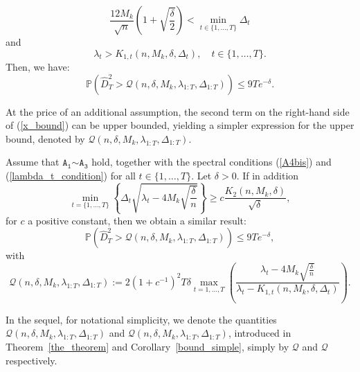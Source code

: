 \documentclass[twoside,11pt]{article}
\newcommand{\nb}{n}
\newcommand{\PPO}{\mathbb{P} }
\newcommand{\A}[1]{$\mathtt{A_#1}$}
\newcommand{\qmaj}{\mathcal{Q}}
\newcommand{\qmajbis}{\mathscr{Q}}
\begin{document}
\begin{theorem}
\begin{equation}
 \frac{12 M_k}{\sqrt{n}} \left( 1 + \sqrt{\frac{\delta}{2}}\right)  < \underset{t \in \{1,\ldots,T\}}{\min} \Delta_t \tag{SP1}
 \end{equation}
 and
    \begin{equation}
        \lambda_t > K_{1,t}\left(\nb,M_k,\delta,\Delta_t \right), \quad t \in \{1,\ldots,T\}. \tag{SP2}
        \label{lambda_t_condition}
    \end{equation}
Then, we have:
    \begin{equation*}
    \PPO \left(\widehat{D}^2_T > \qmaj\left(\nb,\delta,M_k,\lambda_{1:T},\Delta_{1:T}\right) \right) \leq  9 T e^{-\delta}.
    \end{equation*}
\label{the_theorem}
\end{theorem}
At the price of an additional assumption, the second term on the right-hand side of (\ref{x_bound}) can be upper bounded, yielding a simpler expression for the upper bound, denoted by $\qmajbis\left(\nb,\delta,M_k,\lambda_{1:T},\Delta_{1:T}\right)$.
\begin{corollary}
Assume that \A{1}$\sim$\A{3} hold, together with the spectral conditions (\ref{A4bis}) and  (\ref{lambda_t_condition}) for all $t \in \{1,\ldots,T\}$. Let $\delta>0$. If in addition
\begin{equation}
    \underset{t=\{1,\ldots,T\}}{\min} \left\{\Delta_t \sqrt{\lambda_t - 4 M_k \sqrt{\frac{\delta}{\nb}}} \right\} \geq c \frac{K_2 \left( \nb,M_k,\delta \right)}{\sqrt{\delta}},
    \label{K_3_simplified}  \tag{SP3}
\end{equation}
for $c$ a positive constant, then we obtain a similar result:
    \begin{equation*}
        \PPO \left(\widehat{D}^2_T > \qmajbis \left(\nb,\delta,M_k,\lambda_{1:T},\Delta_{1:T}\right) \right) \leq  9 T e^{-\delta},
    \end{equation*}
    with
    \begin{equation}
        \qmajbis\left(\nb,\delta,M_k,\lambda_{1:T},\Delta_{1:T}\right) := 2\left(1+c^{-1}\right)^2 T \delta \underset{t=1,\ldots,T}{\max}  \left(\frac{\lambda_t - 4 M_k \sqrt{\frac{\delta}{\nb}}}{\lambda_t - K_{1,t}\left(\nb,M_k,\delta,\Delta_t \right) }  \right). 
        \label{x_simplified}
    \end{equation}
\label{bound_simple}
\end{corollary}
In the sequel, for notational simplicity, we denote the quantities $\qmaj \left(\nb,\delta,M_k,\lambda_{1:T},\Delta_{1:T}\right) $ and $\qmajbis\left(\nb,\delta,M_k,\lambda_{1:T},\Delta_{1:T}\right)$, introduced in Theorem~\ref{the_theorem} and Corollary~\ref{bound_simple}, simply by $\qmaj$ and $\qmajbis$ respectively.
\end{document}

